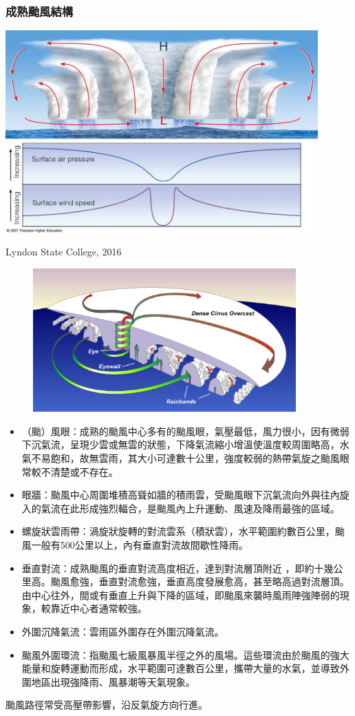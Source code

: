 \documentclass[a4paper,12pt]{report}
\begin{document}
\begin{itemize}
\subsubsection{成熟颱風結構}
\bct\bfH\ctr\includegraphics[width=0.9\textwidth]{hurricane_structure.jpg}\caption{Lyndon State College, 2016}\ef\FB\ect
\bct\begin{figure}[H]\ctr
\includegraphics[width=0.9\textwidth]{hurricane.jpg}
\end{figure}\FB\ect
\begin{itemize}
  \item （颱）風眼：成熟的颱風中心多有的颱風眼，氣壓最低，風力很小，因有微弱下沉氣流，呈現少雲或無雲的狀態，下降氣流縮小增溫使溫度較周圍略高，水氣不易飽和，故無雲雨，其大小可達數十公里，強度較弱的熱帶氣旋之颱風眼常較不清楚或不存在。
  \item 眼牆：颱風中心周圍堆積高聳如牆的積雨雲，受颱風眼下沉氣流向外與往內旋入的氣流在此形成強烈輻合，是颱風內上升運動、風速及降雨最強的區域。
  \item 螺旋狀雲雨帶：渦旋狀旋轉的對流雲系（積狀雲），水平範圍約數百公里，颱風一般有500公里以上，內有垂直對流故間歇性降雨。
\item 垂直對流：成熟颱風的垂直對流高度相近，達到對流層頂附近 ，即約十幾公里高。颱風愈強，垂直對流愈強，垂直高度發展愈高，甚至略高過對流層頂。由中心往外，間或有垂直上升與下降的區域，即颱風來襲時風雨陣強陣弱的現象，較靠近中心者通常較強。
\item 外圍沉降氣流：雲雨區外圍存在外圍沉降氣流。
  \item 颱風外圍環流：指颱風七級風暴風半徑之外的風場。這些環流由於颱風的強大能量和旋轉運動而形成，水平範圍可達數百公里，攜帶大量的水氣，並導致外圍地區出現強降雨、風暴潮等天氣現象。
\end{itemize}
颱風路徑常受高壓帶影響，沿反氣旋方向行進。

\end{itemize}
\end{document}

